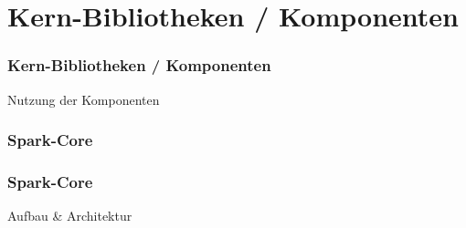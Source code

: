 \documentclass[hyperref={pdfpagelabels=false}]{beamer}
\begin{document}
\section{Kern-Bibliotheken / Komponenten}
\begin{frame} [t]
\frametitle{Kern-Bibliotheken / Komponenten}


Nutzung der Komponenten
\begin{figure}[h]
  \centering
\end{figure}



\end{frame}

\subsubsection{Spark-Core}
\begin{frame} [t]
\frametitle{Spark-Core}


Aufbau \& Architektur

\begin{figure}[h]
  \centering
\end{figure}

\end{frame}
\end{document}
